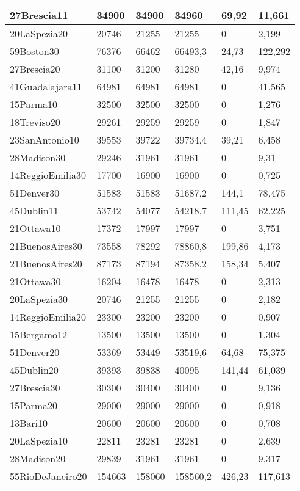 \begin{longtable}[c]{|l|l|l|l|l|l|}
27Brescia11 & 34900 & 34900 & 34960 & 69,92 & 11,661 \\ \hline
20LaSpezia20 & 20746 & 21255 & 21255 & 0 & 2,199 \\ \hline
59Boston30 & 76376 & 66462 & 66493,3 & 24,73 & 122,292 \\ \hline
27Brescia20 & 31100 & 31200 & 31280 & 42,16 & 9,974 \\ \hline
41Guadalajara11 & 64981 & 64981 & 64981 & 0 & 41,565 \\ \hline
15Parma10 & 32500 & 32500 & 32500 & 0 & 1,276 \\ \hline
18Treviso20 & 29261 & 29259 & 29259 & 0 & 1,847 \\ \hline
23SanAntonio10 & 39553 & 39722 & 39734,4 & 39,21 & 6,458 \\ \hline
28Madison30 & 29246 & 31961 & 31961 & 0 & 9,31 \\ \hline
14ReggioEmilia30 & 17700 & 16900 & 16900 & 0 & 0,725 \\ \hline
51Denver30 & 51583 & 51583 & 51687,2 & 144,1 & 78,475 \\ \hline
45Dublin11 & 53742 & 54077 & 54218,7 & 111,45 & 62,225 \\ \hline
21Ottawa10 & 17372 & 17997 & 17997 & 0 & 3,751 \\ \hline
21BuenosAires30 & 73558 & 78292 & 78860,8 & 199,86 & 4,173 \\ \hline
21BuenosAires20 & 87173 & 87194 & 87358,2 & 158,34 & 5,407 \\ \hline
21Ottawa30 & 16204 & 16478 & 16478 & 0 & 2,313 \\ \hline
20LaSpezia30 & 20746 & 21255 & 21255 & 0 & 2,182 \\ \hline
14ReggioEmilia20 & 23300 & 23200 & 23200 & 0 & 0,907 \\ \hline
15Bergamo12 & 13500 & 13500 & 13500 & 0 & 1,304 \\ \hline
51Denver20 & 53369 & 53449 & 53519,6 & 64,68 & 75,375 \\ \hline
45Dublin20 & 39393 & 39838 & 40095 & 141,44 & 61,039 \\ \hline
27Brescia30 & 30300 & 30400 & 30400 & 0 & 9,136 \\ \hline
15Parma20 & 29000 & 29000 & 29000 & 0 & 0,918 \\ \hline
13Bari10 & 20600 & 20600 & 20600 & 0 & 0,708 \\ \hline
20LaSpezia10 & 22811 & 23281 & 23281 & 0 & 2,639 \\ \hline
28Madison20 & 29839 & 31961 & 31961 & 0 & 9,317 \\ \hline
55RioDeJaneiro20 & 154663 & 158060 & 158560,2 & 426,23 & 117,613 \\ \hline
\end{longtable}

